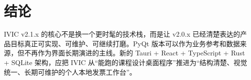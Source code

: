 \documentclass[UTF8,zihao=-4]{ctexart}
\begin{document}
\section{结论}

IVIC v2.1.x 的核心不是换一个更时髦的技术栈，而是让 v2.0.x 已经清楚表达的产品目标真正可实现、可维护、可继续打磨。PyQt 版本可以作为业务参考和数据来源，但不再作为界面长期演进的主线。新的 Tauri + React + TypeScript + Rust + SQLite 架构，应把 IVIC 从“能跑的课程设计桌面程序”推进为“结构清楚、视觉统一、长期可维护的个人本地发票工作台”。
\end{document}
